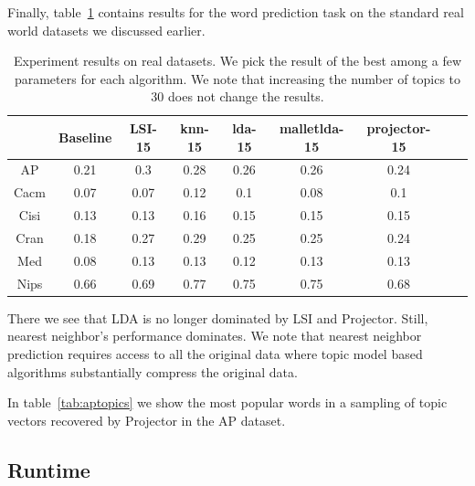 Finally, table~\ref{tab:real} contains results for the word prediction
task on the standard real world datasets we discussed earlier.

\begin{table}[ht]
{\small
\begin{center}
\begin{tabular}{|c|c|c|c|c|c|c|c|c|}
\hline 
 &Baseline &LSI-15 &knn-15 &lda-15 &malletlda-15 &projector-15 \\
 \hline 
AP &0.21 &0.3 &0.28 &0.26 &0.26 &0.24 \\
 \hline 
Cacm &0.07 &0.07 &0.12 &0.1 &0.08 &0.1 \\
 \hline 
Cisi &0.13 &0.13 &0.16 &0.15 &0.15 &0.15 \\
 \hline 
Cran &0.18 &0.27 &0.29 &0.25 &0.25 &0.24 \\
 \hline 
Med &0.08 &0.13 &0.13 &0.12 &0.13 &0.13 \\
 \hline 
Nips &0.66 &0.69 &0.77 &0.75 &0.75 &0.68 \\
 \hline 

\end{tabular}
\end{center}
}
\caption{Experiment results on real datasets. We pick the result of the best among a few parameters for each algorithm. We note that increasing the number of topics to 30 does not change the results. }
\label{tab:real}
\end{table}


There we see that LDA is no longer dominated by LSI and Projector.
Still, nearest neighbor's performance dominates. We note that nearest
neighbor prediction requires access to all the original data where topic
model based algorithms substantially compress the original data. 

In table~\ref{tab:aptopics} we show the most popular words in a
sampling of topic vectors recovered by Projector in the AP dataset.




\subsection{Runtime}

